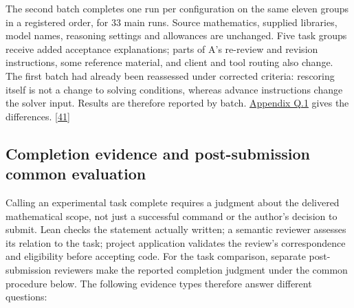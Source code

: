 The second batch completes one run per configuration on the same eleven groups in a registered order, for 33 main runs. Source mathematics, supplied libraries, model names, reasoning settings and allowances are unchanged. Five task groups receive added acceptance explanations; parts of A's re-review and revision instructions, some reference material, and client and tool routing also change. The first batch had already been reassessed under corrected criteria: rescoring itself is not a change to solving conditions, whereas advance instructions change the solver input. Results are therefore reported by batch. \href{en-appendix.pdf\#q1}{Appendix Q.1} gives the differences. \hyperlink{ref-41}{\mbox{[41]}}

\subsection[Completion evidence and post-submission common evaluation]{\texorpdfstring{\protect\hypertarget{section-2-4}{}Completion evidence and post-submission common evaluation}{Completion evidence and post-submission common evaluation}}
Calling an experimental task complete requires a judgment about the delivered mathematical scope, not just a successful command or the author's decision to submit. Lean checks the statement actually written; a semantic reviewer assesses its relation to the task; project application validates the review's correspondence and eligibility before accepting code. For the task comparison, separate post-submission reviewers make the reported completion judgment under the common procedure below. The following evidence types therefore answer different questions:


